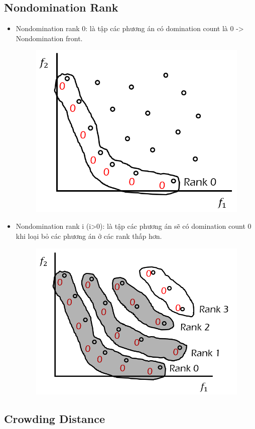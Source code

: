 \documentclass{book}
\begin{document}
\subsection{Nondomination Rank}
\begin{itemize}
    \item Nondomination rank 0: là tập các phương án có domination count là 0 -> Nondomination front.
    \begin{figure}[H]
        \centering
        \includegraphics[width=0.5\linewidth]{images/GA-7-8_31.png}
    \end{figure}
    \item Nondomination rank i (i>0): là tập các phương án sẽ có domination count 0 khi loại bỏ các phương án ở các rank thấp hơn.
    \begin{figure}[H]
        \centering
        \includegraphics[width=0.5\linewidth]{images/GA-7-8_35.png}
    \end{figure}
\end{itemize}

\subsection{Crowding Distance}
\end{document}
